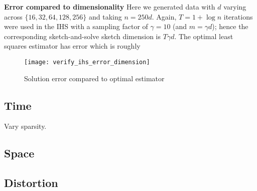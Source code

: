\textbf{Error compared to dimensionality}
Here we generated data with $d$ varying across $\{ 16,32,64,128,256 \}$ and
taking $n = 250d$.
Again, $T = 1 + \log n$ iterations were used in the IHS with a sampling factor
of $\gamma=10$ (and $m = \gamma d$); hence the corresponding sketch-and-solve
sketch dimension is $T \gamma d$.
The optimal least squares estimator has error which is roughly

\begin{figure}
  \centering
  \texttt{[image: verify\_ihs\_error\_dimension]}
  \caption{Solution error compared to optimal estimator}
  \label{fig: error-vary-columns}
\end{figure}

\subsection{Time}
Vary sparsity.
\subsection{Space}

\subsection{Distortion}
